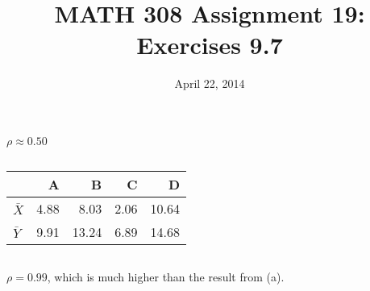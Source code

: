 \documentclass[twocolumn]{article}
\title{MATH 308 Assignment 19:\\Exercises 9.7}
\date{April 22, 2014}
\begin{document}
\maketitle

\subsection{}
$\rho\approx0.50$
\subsection{}
\begin{table}[h]\centering
\begin{tabular}{@{}lrrrr@{}}
\toprule
  & A    & B     & C    & D     \\ \midrule
$\bar X$ & 4.88 & 8.03  & 2.06 & 10.64 \\
$\bar Y$ & 9.91 & 13.24 & 6.89 & 14.68 \\ \bottomrule
\end{tabular}
\end{table}
\subsection{}
$\rho=0.99$, which is much higher than the result from (a).

\end{document}
